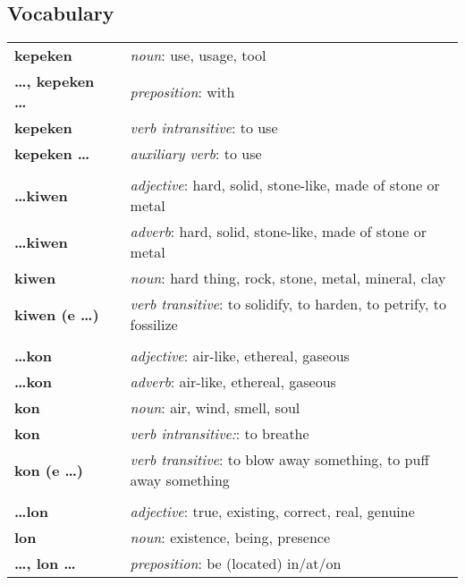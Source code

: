 \subsection*{Vocabulary}
\begin{supertabular}{p{2,5cm}|ll}
\textbf{kepeken} && \textit{noun}: use, usage, tool \\ %
\textbf{\dots , kepeken \dots} && \textit{preposition}: with \\ %
\textbf{kepeken} && \textit{verb intransitive}: to use \\ %
\textbf{kepeken \dots} && \textit{auxiliary verb}: to use \\ %
 && \\ %
\textbf{\dots kiwen} && \textit{adjective}: hard, solid, stone-like, made of stone or metal \\ %
\textbf{\dots kiwen} && \textit{adverb}: hard, solid, stone-like, made of stone or metal \\ %
\textbf{kiwen} && \textit{noun}: hard thing, rock, stone, metal, mineral, clay \\ %
\textbf{kiwen (e \dots)} && \textit{verb transitive}: to solidify, to harden, to petrify, to fossilize \\ %
 && \\ %
\textbf{\dots kon} && \textit{adjective}: air-like, ethereal, gaseous \\ %
\textbf{\dots kon} && \textit{adverb}: air-like, ethereal, gaseous \\ %
\textbf{kon} && \textit{noun}: air, wind, smell, soul \\ %
\textbf{kon} && \textit{verb intransitive:}: to breathe \\ %
\textbf{kon (e \dots)} && \textit{verb transitive}: to blow away something, to puff away something \\ %
 && \\ %
\textbf{\dots lon} && \textit{adjective}: true, existing, correct, real, genuine \\ %
\textbf{lon} && \textit{noun}: existence, being, presence \\ %
\textbf{\dots , lon \dots} && \textit{preposition}: be (located) in/at/on \\ %

\end{supertabular}
